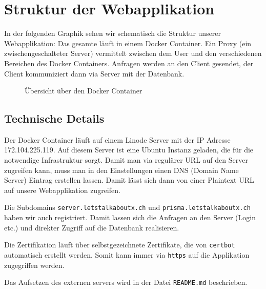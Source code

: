 \section{Struktur der Webapplikation}

In der folgenden Graphik sehen wir schematisch die Struktur unserer Webapplikation: Das gesamte läuft in einem Docker Container. Ein Proxy (ein zwischengeschalteter Server) vermittelt zwischen dem User und den verschiedenen Bereichen des Docker Containers. Anfragen werden an den Client gesendet, der Client kommuniziert dann via Server mit der Datenbank.
\begin{figure}[ht]
    \caption{Übersicht über den Docker Container \cite{fig:docker}}
\end{figure}

\subsection{Technische Details}

Der Docker Container läuft auf einem Linode Server mit der IP Adresse 172.104.225.119. Auf diesem Server ist eine Ubuntu Instanz geladen, die für die notwendige Infrastruktur sorgt. Damit man via regulärer URL auf den Server zugreifen kann, muss man in den Einstellungen einen DNS (Domain Name Server) Eintrag erstellen lassen. Damit lässt sich dann von einer Plaintext URL auf unsere Webapplikation zugreifen. 

Die Subdomains \verb|server.letstalkaboutx.ch| und \verb|prisma.letstalkaboutx.ch| haben wir auch registriert. Damit lassen sich die Anfragen an den Server (Login etc.) und direkter Zugriff auf die Datenbank realisieren.

Die Zertifikation läuft über selbstgezeichnete Zertifikate, die von \verb|certbot| automatisch erstellt werden. Somit kann immer via \verb|https| auf die Applikation zugegriffen werden.

Das Aufsetzen des externen servers wird in der Datei \verb|README.md| beschrieben.









